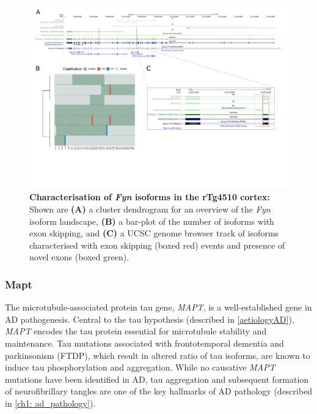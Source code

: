 \begin{landscape}
	\begin{figure}[htp]
		\centering
		\captionsetup{width=1.3\textwidth}
		\includegraphics[page=7,trim={0 1cm 0 0},scale = 0.85]{Figures/TargetGenes_Annotation_Landscape.pdf}
		\caption[Characterisation of \textit{Fyn} isoforms in the rTg4510 cortex]%
		{\textbf{Characterisation of \textit{Fyn} isoforms in the rTg4510 cortex:} Shown are \textbf{(A)} a cluster dendrogram for an overview of the \textit{Fyn} isoform landscape, \textbf{(B)} a bar-plot of the number of isoforms with exon skipping, and \textbf{(C)} a UCSC genome browser track of isoforms characterised with exon skipping (boxed red) events and presence of novel exons (boxed green).}    
		\label{fig:fyn}
	\end{figure}
\end{landscape}
\restoregeometry

\newpage
\subsubsection{Mapt}
The microtubule-associated protein tau gene, \textit{MAPT}, is a well-established gene in AD pathogenesis. Central to the tau hypothesis (described in \cref{aetiologyAD}), \textit{MAPT} encodes the tau protein essential for microtubule stability and maintenance. Tau mutations associated with frontotemporal dementia and parkinsonism (FTDP), which result in altered ratio of tau isoforms, are known to induce tau phosphorylation and aggregation\cite{Bowles2022}. While no causative \textit{MAPT} mutations have been identified in AD, tau aggregation and subsequent formation of neurofibrillary tangles are one of the key hallmarks of AD pathology (described in \cref{ch1: ad_pathology}). 

